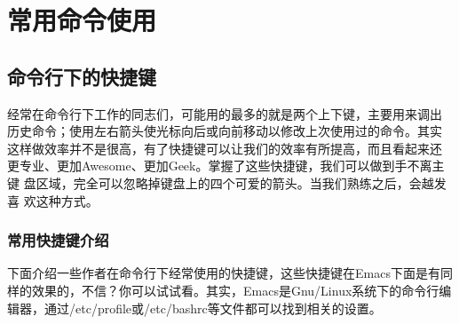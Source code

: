 \chapter{常用命令使用}
\label{sec:basicCommand}

\section{命令行下的快捷键}
\label{shortcut}

经常在命令行下工作的同志们，可能用的最多的就是两个上下键，主要用来调出
历史命令；使用左右箭头使光标向后或向前移动以修改上次使用过的命令。其实
这样做效率并不是很高，有了快捷键可以让我们的效率有所提高，而且看起来还
更专业、更加Awesome、更加Geek。掌握了这些快捷键，我们可以做到手不离主键
盘区域，完全可以忽略掉键盘上的四个可爱的箭头。当我们熟练之后，会越发喜
欢这种方式。

\subsection{常用快捷键介绍}

下面介绍一些作者在命令行下经常使用的快捷键，这些快捷键在Emacs下面是有同
样的效果的，不信？你可以试试看。其实，Emacs是Gnu/Linux系统下的命令行编
辑器，通过/etc/profile或/etc/bashrc等文件都可以找到相关的设置。

